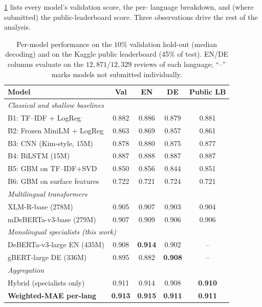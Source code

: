 \documentclass{article}
\theoremstyle{plain}
\begin{document}
\cref{tab:per-model} lists every model's validation score, the per-
language breakdown, and (where submitted) the public-leaderboard score.
Three observations drive the rest of the analysis.

\begin{table}[t]
\caption{Per-model performance on the $10\%$ validation hold-out
(median decoding) and on the Kaggle public leaderboard (45\% of test).
EN/DE columns evaluate on the $12{,}871$/$12{,}329$ reviews of each
language; ``--'' marks models not submitted individually.}
\label{tab:per-model}
\vskip 0.06in
\begin{center}\begin{small}\begin{tabular}{lcccc}
\toprule
Model & Val & EN & DE & Public LB \\
\midrule
\multicolumn{5}{l}{\emph{Classical and shallow baselines}}\\
B1: TF--IDF + LogReg            & 0.882 & 0.886 & 0.879 & 0.881 \\
B2: Frozen MiniLM + LogReg      & 0.863 & 0.869 & 0.857 & 0.861 \\
B3: CNN (Kim-style, 15M)        & 0.878 & 0.880 & 0.875 & 0.877 \\
B4: BiLSTM (15M)                & 0.887 & 0.888 & 0.887 & 0.887 \\
B5: GBM on TF--IDF$+$SVD        & 0.850 & 0.856 & 0.844 & 0.851 \\
B6: GBM on surface features     & 0.722 & 0.721 & 0.724 & 0.721 \\
\midrule
\multicolumn{5}{l}{\emph{Multilingual transformers}}\\
XLM-R-base ($278$M)             & 0.905 & 0.907 & 0.903 & 0.904 \\
mDeBERTa-v3-base ($279$M)       & 0.907 & 0.909 & 0.906 & 0.906 \\
\midrule
\multicolumn{5}{l}{\emph{Monolingual specialists (this work)}}\\
DeBERTa-v3-large EN ($435$M)    & 0.908 & \textbf{0.914} & 0.902 & -- \\
gBERT-large DE ($336$M)         & 0.895 & 0.882 & \textbf{0.908} & -- \\
\midrule
\multicolumn{5}{l}{\emph{Aggregation}}\\
Hybrid (specialists only)       & 0.911 & 0.914 & 0.908 & \textbf{0.910}\\
\textbf{Weighted-MAE per-lang}  & \textbf{0.913} & \textbf{0.915} & \textbf{0.911} & \textbf{0.911}\\
\bottomrule
\end{tabular}\end{small}\end{center}
\vskip -0.15in
\end{table}
\end{document}
